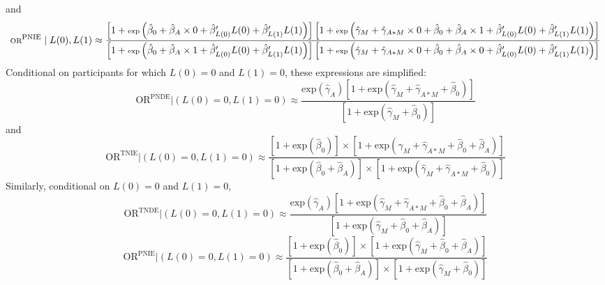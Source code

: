 \documentclass[
]{book}
\begin{document}
and
\[\scriptsize \text{OR}^\text{PNIE} \mid L(0), L(1) \approx \frac{\left[1 + \text{exp}\left(\hat{\beta}_0  + \hat{\beta}_A \times 0 + \hat{\beta}_{L(0)}^\prime L(0) + \hat{\beta}_{L(1)}^\prime L(1)\right) \right] \left[ 1 + \text{exp}\left(\hat{\gamma}_M + \hat{\gamma}_{A \ast M} \times 0 + \hat{\beta}_0  + \hat{\beta}_A \times 1 + \hat{\beta}_{L(0)}^\prime L(0) + \hat{\beta}_{L(1)}^\prime L(1)\right)\right]}{ \left[1 + \text{exp}\left(\hat{\beta}_0  + \hat{\beta}_A \times 1 + \hat{\beta}_{L(0)}^\prime L(0) + \hat{\beta}_{L(1)}^\prime L(1)\right) \right] \left[ 1 + \text{exp}\left(\hat{\gamma}_M + \hat{\gamma}_{A \ast M} \times 0 + \hat{\beta}_0 + \hat{\beta}_A \times 0 + \hat{\beta}_{L(0)}^\prime L(0) + \hat{\beta}_{L(1)}^\prime L(1)\right)\right]} \]
Conditional on participants for which \(L(0)=0\) and \(L(1)=0\), these expressions are simplified:
\[\text{OR}^\text{PNDE} \Bigg| \left(L(0) = 0, L(1) = 0\right) \approx \frac{\text{exp}\left(\hat{\gamma}_A\right) \left[ 1 + \text{exp}\left(\hat{\gamma}_M + \hat{\gamma}_{A \ast M} + \hat{\beta}_0\right)\right]}{ \left[ 1 + \text{exp}\left(\hat{\gamma}_M + \hat{\beta}_0 \right)\right]}\]
and
\[\text{OR}^\text{TNIE} \Bigg| \left(L(0)=0, L(1)=0\right) \approx \frac{\left[1 + \text{exp}\left(\hat{\beta}_0\right) \right] \times \left[ 1 + \text{exp}\left(\hat{\gamma}_M + \hat{\gamma}_{A \ast M} + \hat{\beta}_0  + \hat{\beta}_A\right)\right]}{ \left[1 + \text{exp}\left(\hat{\beta}_0  + \hat{\beta}_A \right) \right] \times \left[ 1 + \text{exp}\left(\hat{\gamma}_M + \hat{\gamma}_{A \ast M} + \hat{\beta}_0 \right)\right]} \]
Similarly, conditional on \(L(0)=0\) and \(L(1)=0\),
\[\text{OR}^\text{TNDE} \Bigg| \left(L(0)=0, L(1)=0\right) \approx \frac{\text{exp}\left(\hat{\gamma}_A\right) \left[ 1 + \text{exp}\left(\hat{\gamma}_M + \hat{\gamma}_{A \ast M} + \hat{\beta}_0 + \hat{\beta}_A \right)\right]}{ \left[ 1 + \text{exp}\left(\hat{\gamma}_M + \hat{\beta}_0 + \hat{\beta}_A \right)\right]}\]
\[\text{OR}^\text{PNIE} \Bigg| \left(L(0)=0, L(1)=0\right) \approx \frac{\left[1 + \text{exp}\left(\hat{\beta}_0 \right) \right] \times \left[ 1 + \text{exp}\left(\hat{\gamma}_M + \hat{\beta}_0  + \hat{\beta}_A \right)\right]}{ \left[1 + \text{exp}\left(\hat{\beta}_0  + \hat{\beta}_A \right) \right] \times \left[ 1 + \text{exp}\left(\hat{\gamma}_M +  \hat{\beta}_0 \right)\right]} \]
\end{document}
